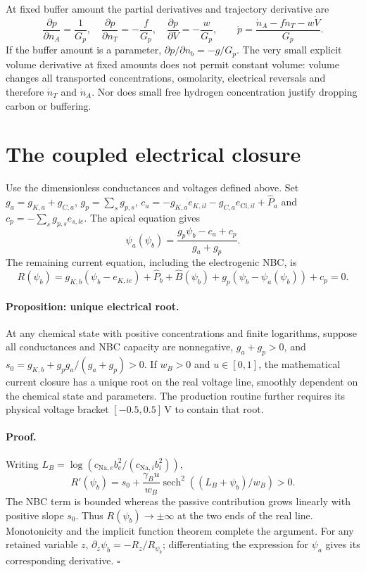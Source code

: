 At fixed buffer amount the partial derivatives and trajectory derivative
are
\begin{equation}
 \frac{\partial p}{\partial n_A}=\frac1{G_p},\quad
 \frac{\partial p}{\partial n_T}=-\frac f{G_p},\quad
 \frac{\partial p}{\partial V}=-\frac w{G_p},\qquad
 \dot p=\frac{\dot n_A-f\dot n_T-w\dot V}{G_p}.
 \label{eq:ph-derivatives}
\end{equation}
If the buffer amount is a parameter, $\partial p/\partial n_b=-g/G_p$.
The very small explicit volume derivative at fixed amounts does not permit
constant volume: volume changes all transported concentrations, osmolarity,
electrical reversals and therefore $\dot n_T$ and $\dot n_A$.  Nor does
small free hydrogen concentration justify dropping carbon or buffering.

\section{The coupled electrical closure}
\label{sec:electrical-proof}
Use the dimensionless conductances and voltages defined above.  Set
$g_a=g_{K,a}+g_{C,a}$, $g_p=\sum_sg_{p,s}$,
$c_a=-g_{K,a}e_{K,il}-g_{C,a}e_{\mathrm{Cl},il}+\widehat P_a$
and $c_p=-\sum_sg_{p,s}e_{s,le}$.  The apical equation gives
\[
 \psi_a(\psi_b)=\frac{g_p\psi_b-c_a+c_p}{g_a+g_p}.
\]
The remaining current equation, including the electrogenic NBC, is
\begin{equation}
 R(\psi_b)=g_{K,b}(\psi_b-e_{K,ie})+\widehat P_b
      +\widehat B(\psi_b)+g_p(\psi_b-\psi_a(\psi_b))+c_p=0.
 \label{eq:electrical-scalar}
\end{equation}

\paragraph{Proposition: unique electrical root.}
At any chemical state with positive concentrations and finite logarithms,
suppose all conductances and NBC capacity are nonnegative,
$g_a+g_p>0$, and
$s_0=g_{K,b}+g_pg_a/(g_a+g_p)>0$.  If $w_B>0$ and $u\in[0,1]$,
the mathematical current closure has a unique root on the real voltage
line, smoothly dependent on the chemical state and parameters.  The
production routine further requires its physical voltage bracket
$[-0.5,0.5]\,\mathrm V$ to contain that root.

\paragraph{Proof.}
Writing $L_B=\log(c_{\mathrm{Na},e}b_e^2/(c_{\mathrm{Na},i}b_i^2))$,
\[
 R'(\psi_b)=s_0+\frac{\gamma_Bu}{w_B}
       \operatorname{sech}^2((L_B+\psi_b)/w_B)>0.
\]
The NBC term is bounded whereas the passive contribution grows linearly
with positive slope $s_0$.  Thus $R(\psi_b)\to\pm\infty$ at the two
ends of the real line.  Monotonicity and the implicit function theorem
complete the argument.  For any retained variable $z$,
$\partial_z\psi_b=-R_z/R_{\psi_b}$; differentiating the expression
for $\psi_a$ gives its corresponding derivative. $\square$

